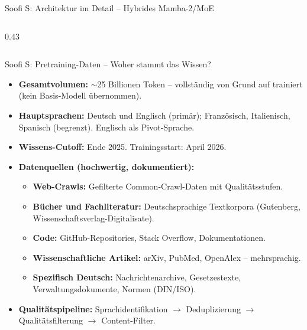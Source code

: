 \documentclass[aspectratio=1610, xcolor=dvipsnames, 9pt]{beamer}
\begin{document}
\begin{frame}{Soofi S: Architektur im Detail -- Hybrides Mamba-2/MoE}
\begin{columns}
\begin{column}{0.43\textwidth}
    \end{column}
  \end{columns}
\end{frame}

\begin{frame}{Soofi S: Pretraining-Daten -- Woher stammt das Wissen?}
  \begin{itemize}
    \item \textbf{Gesamtvolumen:} $\sim$25 Billionen Token -- vollständig von Grund auf trainiert (kein Basis-Modell übernommen).
    \item \textbf{Hauptsprachen:} Deutsch und Englisch (primär); Französisch, Italienisch, Spanisch (begrenzt). Englisch als Pivot-Sprache.
    \item \textbf{Wissens-Cutoff:} Ende 2025. Trainingsstart: April 2026.
    \item \textbf{Datenquellen (hochwertig, dokumentiert):}
      \begin{itemize}
        \item \textbf{Web-Crawls:} Gefilterte Common-Crawl-Daten mit Qualitätsstufen.
        \item \textbf{Bücher und Fachliteratur:} Deutschsprachige Textkorpora (Gutenberg, Wissenschaftsverlag-Digitalisate).
        \item \textbf{Code:} GitHub-Repositories, Stack Overflow, Dokumentationen.
        \item \textbf{Wissenschaftliche Artikel:} arXiv, PubMed, OpenAlex -- mehrsprachig.
        \item \textbf{Spezifisch Deutsch:} Nachrichtenarchive, Gesetzestexte, Verwaltungsdokumente, Normen (DIN/ISO).
      \end{itemize}
    \item \textbf{Qualitätspipeline:} Sprachidentifikation $\rightarrow$ Deduplizierung $\rightarrow$ Qualitätsfilterung $\rightarrow$ Content-Filter.
  \end{itemize}
\end{frame}
\end{document}
